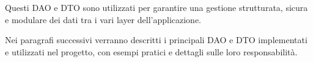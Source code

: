 Questi DAO e DTO sono utilizzati per garantire una gestione strutturata, sicura e modulare dei dati tra i vari layer dell'applicazione.

Nei paragrafi successivi verranno descritti i principali DAO e DTO implementati e utilizzati nel progetto, con esempi pratici e dettagli sulle loro responsabilità.
